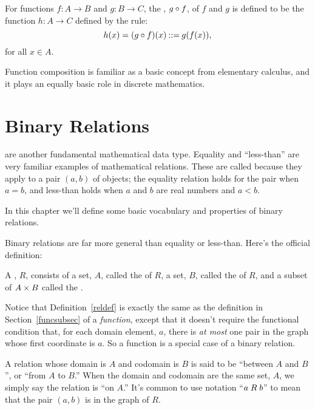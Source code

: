 \begin{definition}\label{func_compose_def}
  For functions $f:A \to B$ and $g:B \to C$,  the
  , $g \circ f$, of $f$ and $g$ is defined to be the
  function $h:A \to C$ defined by the rule:
\begin{displaymath}
h(x) = (g \circ f)(x) \mathbin{::=} g(f(x)),
\end{displaymath}
for all $x \in A$.
\end{definition}

Function composition is familiar as a basic concept from elementary
calculus, and it plays an equally basic role in discrete mathematics.

\section{Binary Relations}

 are another fundamental mathematical data type.  Equality
and ``less-than'' are very familiar examples of mathematical relations.
These are called  because they apply to a pair
$(a,b)$ of objects; the equality relation holds for the pair when $a=b$,
and less-than holds when $a$ and $b$ are real numbers and $a < b$.

In this chapter we'll define some basic vocabulary and properties of binary
relations.

Binary relations are far more general than equality or less-than.
Here's the official definition:
\begin{definition}\label{reldef}
A , $R$, consists of a set, $A$, called
the  of $R$, a set, $B$, called the  of $R$, and
a subset of $A \times B$ called the .
\end{definition}

Notice that Definition~\ref{reldef} is exactly the same as the definition
in Section~\ref{funcsubsec} of a {\emph{function}}, except that it doesn't
require the functional condition that, for each domain element, $a$, there
is \emph{at most} one pair in the graph whose first coordinate is $a$.  So
a function is a special case of a binary relation.

A relation whose domain is $A$ and codomain is $B$ is said to be
``between $A$ and $B$'', or ``from $A$ to $B$.''  When the domain and
codomain are the same set, $A$, we simply say the relation is ``on
$A$.''  It's common to use  notation ``$a \mathrel{R} b$'' to
mean that the pair $(a,b)$ is in the graph of $R$.

